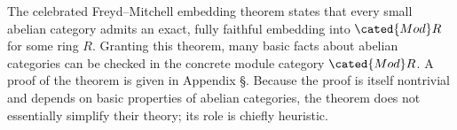 The celebrated Freyd--Mitchell embedding theorem states that every small abelian category admits an exact, fully faithful embedding into $\cated{Mod}R$ for some ring $R$. Granting this theorem, many basic facts about abelian categories can be checked in the concrete module category $\cated{Mod}R$. A proof of the theorem is given in Appendix
\S{}. Because the proof is itself nontrivial and depends on basic properties of abelian categories, the theorem does not essentially simplify their theory; its role is chiefly heuristic.
